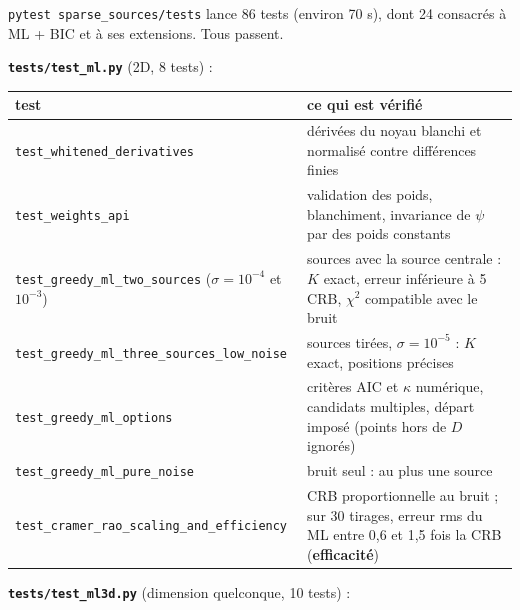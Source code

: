 \documentclass[
  french,
]{article}
\newcounter{none} %
\begin{document}
\texttt{pytest\ sparse\_sources/tests} lance 86 tests (environ 70 s),
dont 24 consacrés à ML + BIC et à ses extensions. Tous passent.

\textbf{\texttt{tests/test\_ml.py}} (2D, 8 tests) :

{\def\LTcaptype{none} %
\begin{longtable}[]{@{}
  >{\raggedright\arraybackslash}p{}
  >{\raggedright\arraybackslash}p{}@{}}
\toprule\noalign{}
\begin{minipage}[b]{\linewidth}\raggedright
test
\end{minipage} & \begin{minipage}[b]{\linewidth}\raggedright
ce qui est vérifié
\end{minipage} \\
\midrule\noalign{}
\endhead
\bottomrule\noalign{}
\endlastfoot
\texttt{test\_whitened\_derivatives} & dérivées du noyau blanchi et
normalisé contre différences finies \\
\texttt{test\_weights\_api} & validation des poids, blanchiment,
invariance de \(\psi\) par des poids constants \\
\texttt{test\_greedy\_ml\_two\_sources} (\(\sigma = 10^{-4}\) et
\(10^{-3}\)) & 2 sources avec la source centrale : \(K\) exact, erreur
inférieure à 5 CRB, \(\chi^2\) compatible avec le bruit \\
\texttt{test\_greedy\_ml\_three\_sources\_low\_noise} & 3 sources
tirées, \(\sigma = 10^{-5}\) : \(K\) exact, positions précises \\
\texttt{test\_greedy\_ml\_options} & critères AIC et \(\kappa\)
numérique, candidats multiples, départ imposé (points hors de \(D\)
ignorés) \\
\texttt{test\_greedy\_ml\_pure\_noise} & bruit seul : au plus une
source \\
\texttt{test\_cramer\_rao\_scaling\_and\_efficiency} & CRB
proportionnelle au bruit ; sur 30 tirages, erreur rms du ML entre 0,6 et
1,5 fois la CRB (\textbf{efficacité}) \\
\end{longtable}
}

\textbf{\texttt{tests/test\_ml3d.py}} (dimension quelconque, 10 tests) :
\end{document}
